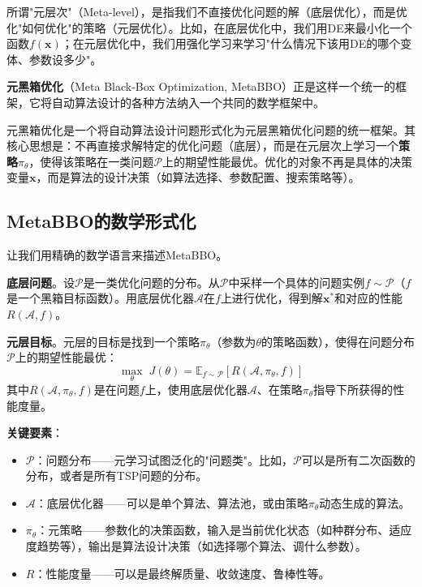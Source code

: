 \documentclass[lang=cn,zihao=-4,a4paper,fontset=windows]{beautybook}
\begin{document}
所谓"元层次"（Meta-level），是指我们不直接优化问题的解（底层优化），而是优化"如何优化"的策略（元层优化）。比如，在底层优化中，我们用DE来最小化一个函数$f(\mathbf{x})$；在元层优化中，我们用强化学习来学习"什么情况下该用DE的哪个变体、参数设多少"。

\textbf{元黑箱优化}（Meta Black-Box Optimization, MetaBBO）正是这样一个统一的框架，它将自动算法设计的各种方法纳入一个共同的数学框架中。

\begin{definition}
元黑箱优化是一个将自动算法设计问题形式化为元层黑箱优化问题的统一框架。其核心思想是：不再直接求解特定的优化问题（底层），而是在元层次上学习一个\textbf{策略}$\pi_\theta$，使得该策略在一类问题$\mathcal{P}$上的期望性能最优。优化的对象不再是具体的决策变量$\mathbf{x}$，而是算法的设计决策（如算法选择、参数配置、搜索策略等）。
\end{definition}

\subsection{MetaBBO的数学形式化}

让我们用精确的数学语言来描述MetaBBO。

\textbf{底层问题}。设$\mathcal{P}$是一类优化问题的分布。从$\mathcal{P}$中采样一个具体的问题实例$f \sim \mathcal{P}$（$f$是一个黑箱目标函数）。用底层优化器$\mathcal{A}$在$f$上进行优化，得到解$\mathbf{x}^*$和对应的性能$R(\mathcal{A}, f)$。

\textbf{元层目标}。元层的目标是找到一个策略$\pi_\theta$（参数为$\theta$的策略函数），使得在问题分布$\mathcal{P}$上的期望性能最优：
\[
\max_\theta \; J(\theta) = \mathbb{E}_{f \sim \mathcal{P}} \left[ R(\mathcal{A}, \pi_\theta, f) \right]
\]
其中$R(\mathcal{A}, \pi_\theta, f)$是在问题$f$上，使用底层优化器$\mathcal{A}$、在策略$\pi_\theta$指导下所获得的性能度量。

\textbf{关键要素}：
\begin{itemize}
    \item $\mathcal{P}$：问题分布——元学习试图泛化的"问题类"。比如，$\mathcal{P}$可以是所有二次函数的分布，或者是所有TSP问题的分布。
    \item $\mathcal{A}$：底层优化器——可以是单个算法、算法池，或由策略$\pi_\theta$动态生成的算法。
    \item $\pi_\theta$：元策略——参数化的决策函数，输入是当前优化状态（如种群分布、适应度趋势等），输出是算法设计决策（如选择哪个算法、调什么参数）。
    \item $R$：性能度量——可以是最终解质量、收敛速度、鲁棒性等。
\end{itemize}
\end{document}
